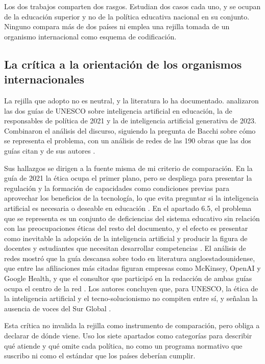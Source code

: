 Los dos trabajos comparten dos rasgos. Estudian dos casos cada uno, y se ocupan de la
educación superior y no de la política educativa nacional en su conjunto. Ninguno compara
más de dos países ni emplea una rejilla tomada de un organismo internacional como esquema de
codificación.

\subsection{La crítica a la orientación de los organismos internacionales}
\label{subsec:ea-critica}

La rejilla que adopto no es neutral, y la literatura lo ha documentado.
\citet{mochizuki2025ethics} analizaron las dos guías de UNESCO sobre inteligencia
artificial en educación, la de responsables de política de 2021 y la de inteligencia
artificial generativa de 2023. Combinaron el análisis del discurso, siguiendo la pregunta
de Bacchi sobre cómo se representa el problema, con un análisis de redes de las 190 obras
que las dos guías citan y de sus autores \citep[pp.~2--4]{mochizuki2025ethics}.

Sus hallazgos se dirigen a la fuente misma de mi criterio de comparación. En la guía de
2021 la ética ocupa el primer plano, pero se despliega para presentar la regulación y la
formación de capacidades como condiciones previas para aprovechar los beneficios de la
tecnología, lo que evita preguntar si la inteligencia artificial es necesaria o deseable en
educación \citep[pp.~5, 8]{mochizuki2025ethics}. En el apartado 6.5, el problema que se
representa es un conjunto de deficiencias del sistema educativo sin relación con las
preocupaciones éticas del resto del documento, y el efecto es presentar como inevitable la
adopción de la inteligencia artificial y producir la figura de docentes y estudiantes que
necesitan desarrollar competencias \citep[p.~11]{mochizuki2025ethics}. El análisis de redes
mostró que la guía descansa sobre todo en literatura angloestadounidense, que entre las
afiliaciones más citadas figuran empresas como McKinsey, OpenAI y Google Health, y que el
consultor que participó en la redacción de ambas guías ocupa el centro de la red
\citep[pp.~12--15]{mochizuki2025ethics}. Los autores concluyen que, para UNESCO, la ética
de la inteligencia artificial y el tecno-solucionismo no compiten entre sí, y señalan la
ausencia de voces del Sur Global \citep[pp.~17--18]{mochizuki2025ethics}.

Esta crítica no invalida la rejilla como instrumento de comparación, pero obliga a declarar
de dónde viene. Uso los siete apartados como categorías para describir qué atiende y qué
omite cada política, no como un programa normativo que suscribo ni como el estándar que los
países deberían cumplir.

